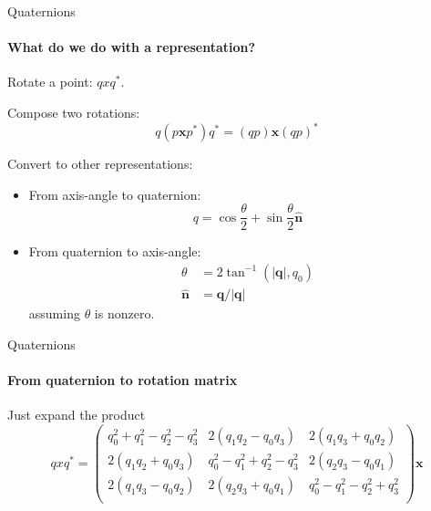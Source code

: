 \documentclass[aspectratio=169]{beamer}
\begin{document}
\begin{frame}{Quaternions}
    \framesubtitle{What do we do with a representation?}
    Rotate a point:  $qxq^*$.

    Compose two rotations:
    \begin{equation}
        q(p\mathbf{x} p^*)q^* = (qp)\mathbf{x}(qp)^*
    \end{equation}

    Convert to other representations:
    \begin{itemize}
        \item  From axis-angle to quaternion:
              \begin{equation}
                  q = \cos \frac{\theta}{2} + \sin \frac{\theta}{2} \hat{\mathbf{n}}
              \end{equation}

        \item  From quaternion to axis-angle:
              \begin{align*}
                  \theta           & = 2 \tan^{-1}(|{\mathbf{q}}|, q_0) \\
                  \hat{\mathbf{n}} & = {\mathbf{q}}/|{\mathbf{q}}|
              \end{align*}
              assuming $\theta$ is nonzero.
    \end{itemize}
\end{frame}


\begin{frame}{Quaternions}
    \framesubtitle{From quaternion to rotation matrix}

    Just expand the product
    \begin{equation}
        qxq^* =
        \left( \begin{array}{ccc}
                q_0^2 + q_1^2 - q_2^2 - q_3^2
                 & 2(q_1 q_2 - q_0 q_3)
                 & 2(q_1 q_3 + q_0 q_2)          \\
                2(q_1 q_2 + q_0 q_3)
                 & q_0^2 - q_1^2 + q_2^2 - q_3^2
                 & 2 (q_2 q_3 - q_0 q_1)         \\
                2(q_1 q_3 - q_0 q_2)
                 & 2 (q_2 q_3 + q_0 q_1)
                 & q_0^2 - q_1^2 - q_2^2 + q_3^2 \\
            \end{array}\right) \mathbf{x}
    \end{equation}
\end{frame}
\end{document}
